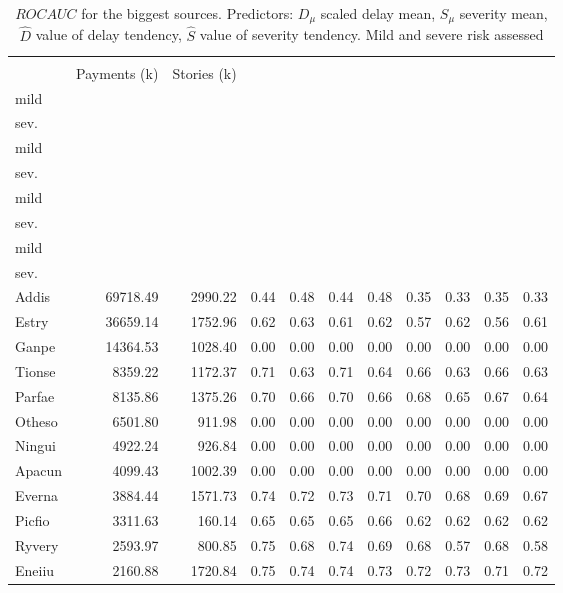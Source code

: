 \begin{table}[htbp!] \centering
\caption{$ROC AUC$ for the biggest sources. Predictors: $D_{\mu}$ scaled delay mean, $S_{\mu}$ severity mean, $\hat{D}$ value of delay tendency, $\hat{S}$ value of severity tendency. Mild and severe risk assessed}
\label{tab:311_ROCAUC_biggest_sources}
\begin{tabular}{lrrrrrrrrrr}
\\[-1.8ex]\hline\hline \\[-1.8ex]
 & Payments (k) & Stories (k) & \makecell{$D_{\mu}$\\mild} & \makecell{$D_{\mu}$\\sev.} & \makecell{$S_{\mu}$\\mild} & \makecell{$S_{\mu}$\\sev.} & \makecell{$\hat{D}$\\mild} & \makecell{$\hat{D}$\\sev.} & \makecell{$\hat{S}$\\mild} & \makecell{$\hat{S}$\\sev.} \\
\midrule
Addis & 69718.49 & 2990.22 & 0.44 & 0.48 & 0.44 & 0.48 & 0.35 & 0.33 & 0.35 & 0.33 \\
Estry & 36659.14 & 1752.96 & 0.62 & 0.63 & 0.61 & 0.62 & 0.57 & 0.62 & 0.56 & 0.61 \\
Ganpe & 14364.53 & 1028.40 & 0.00 & 0.00 & 0.00 & 0.00 & 0.00 & 0.00 & 0.00 & 0.00 \\
Tionse & 8359.22 & 1172.37 & 0.71 & 0.63 & 0.71 & 0.64 & 0.66 & 0.63 & 0.66 & 0.63 \\
Parfae & 8135.86 & 1375.26 & 0.70 & 0.66 & 0.70 & 0.66 & 0.68 & 0.65 & 0.67 & 0.64 \\
Otheso & 6501.80 & 911.98 & 0.00 & 0.00 & 0.00 & 0.00 & 0.00 & 0.00 & 0.00 & 0.00 \\
Ningui & 4922.24 & 926.84 & 0.00 & 0.00 & 0.00 & 0.00 & 0.00 & 0.00 & 0.00 & 0.00 \\
Apacun & 4099.43 & 1002.39 & 0.00 & 0.00 & 0.00 & 0.00 & 0.00 & 0.00 & 0.00 & 0.00 \\
Everna & 3884.44 & 1571.73 & 0.74 & 0.72 & 0.73 & 0.71 & 0.70 & 0.68 & 0.69 & 0.67 \\
Picfio & 3311.63 & 160.14 & 0.65 & 0.65 & 0.65 & 0.66 & 0.62 & 0.62 & 0.62 & 0.62 \\
Ryvery & 2593.97 & 800.85 & 0.75 & 0.68 & 0.74 & 0.69 & 0.68 & 0.57 & 0.68 & 0.58 \\
Eneiiu & 2160.88 & 1720.84 & 0.75 & 0.74 & 0.74 & 0.73 & 0.72 & 0.73 & 0.71 & 0.72 \\

\end{tabular}
\end{table}
